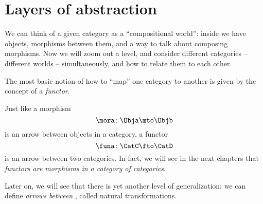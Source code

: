 
\section{Layers of abstraction}
\label{sec:functors}


We can think of a given category \CatC as a ``compositional world'': inside \CatC we have objects, morphisms between them, and a way to talk about composing morphisms.
Now we will zoom out a level, and consider different categories -- different worlds -- simultaneously, and how to relate them to each other.

The most basic notion of how to ``map'' one category to another is given by the concept of a \emph{functor}.

Just like a morphism
%
\begin{equation}
    \mora \colon \Obja \mto \Objb
\end{equation}
%
is an arrow between objects in a category, a functor
%
\begin{equation}
    \funa \colon \CatC \fto \CatD
\end{equation}
%
is an arrow between two categories.
In fact, we will see in the next chapters that \emph{functors are morphisms in a category of categories}.

Later on, we will see that there is yet another level of generalization: we can define \emph{arrows between }, called natural transformations.

